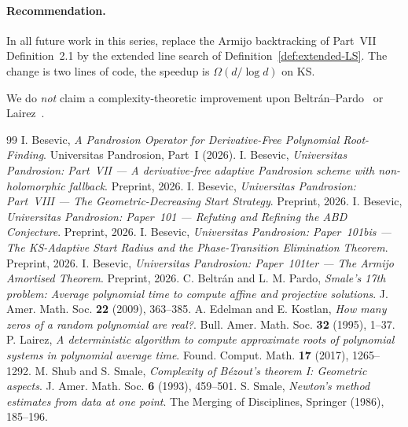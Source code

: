 \documentclass[11pt,a4paper]{article}
\begin{document}
\paragraph{Recommendation.} In all future work in this series, replace the Armijo backtracking of Part~VII Definition~2.1 by the extended line search of Definition~\ref{def:extended-LS}. The change is two lines of code, the speedup is $\Omega(d / \log d)$ on KS.

We do \emph{not} claim a complexity-theoretic improvement upon Beltr\'an--Pardo~\cite{beltranpardo} or Lairez~\cite{lairez}.

\begin{thebibliography}{99}
 I. Besevic, \textit{A Pandrosion Operator for Derivative-Free Polynomial Root-Finding}. Universitas Pandrosion, Part~I (2026).
 I. Besevic, \textit{Universitas Pandrosion: Part~VII --- A derivative-free adaptive Pandrosion scheme with non-holomorphic fallback}. Preprint, 2026.
 I. Besevic, \textit{Universitas Pandrosion: Part~VIII --- The Geometric-Decreasing Start Strategy}. Preprint, 2026.
 I. Besevic, \textit{Universitas Pandrosion: Paper~101 --- Refuting and Refining the ABD Conjecture}. Preprint, 2026.
 I. Besevic, \textit{Universitas Pandrosion: Paper~101bis --- The KS-Adaptive Start Radius and the Phase-Transition Elimination Theorem}. Preprint, 2026.
 I. Besevic, \textit{Universitas Pandrosion: Paper~101ter --- The Armijo Amortised Theorem}. Preprint, 2026.
 C. Beltr\'an and L. M. Pardo, \textit{Smale's 17th problem: Average polynomial time to compute affine and projective solutions}. J. Amer. Math. Soc. \textbf{22} (2009), 363--385.
 A. Edelman and E. Kostlan, \textit{How many zeros of a random polynomial are real?}. Bull. Amer. Math. Soc. \textbf{32} (1995), 1--37.
 P. Lairez, \textit{A deterministic algorithm to compute approximate roots of polynomial systems in polynomial average time}. Found. Comput. Math. \textbf{17} (2017), 1265--1292.
 M. Shub and S. Smale, \textit{Complexity of B\'ezout's theorem I: Geometric aspects}. J. Amer. Math. Soc. \textbf{6} (1993), 459--501.
 S. Smale, \textit{Newton's method estimates from data at one point}. The Merging of Disciplines, Springer (1986), 185--196.
\end{thebibliography}
\end{document}
